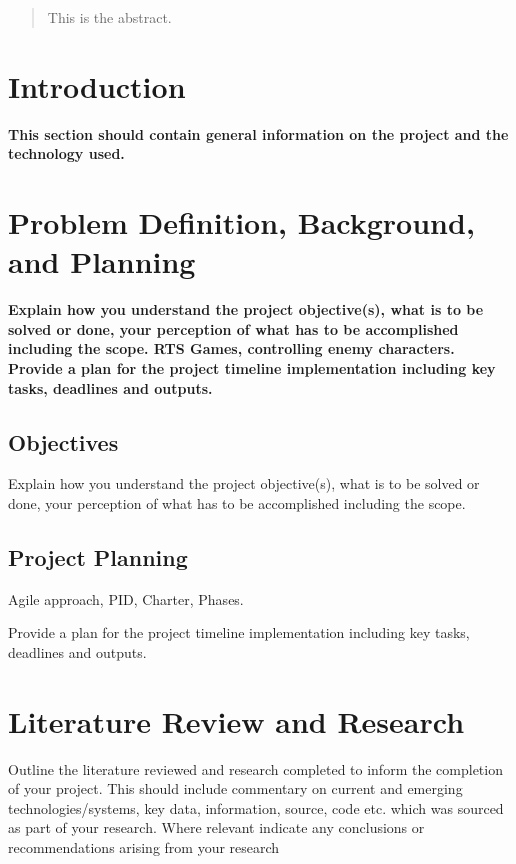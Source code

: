 \documentclass[12pt,a4paper,titlepage]{article}
\begin{document}


\begin{abstract}
This is the abstract.
\end{abstract}

\tableofcontents

\newpage

\listoftables

\newpage

\listoffigures

\newpage

\section{Introduction}
\textbf{This section should contain general information on the project and the technology used.}\\



\section{Problem Definition, Background, and Planning}

\textbf{Explain how you understand the project objective(s), what is to be solved or done, your perception of what has to be accomplished including the scope. RTS Games, controlling enemy characters. Provide a plan for the project timeline implementation including key tasks, deadlines and outputs.}\\

\subsection{Objectives}
Explain how you understand the project objective(s), what is to be solved or done, your perception of what has to be accomplished including the scope. 

\subsection{Project Planning}
Agile approach, PID, Charter, Phases.

Provide a plan for the project timeline implementation including key tasks, deadlines and outputs.

\section{Literature Review and Research}
Outline the literature reviewed and research completed to inform the completion of your project.  This should include commentary on current and emerging technologies/systems, key data, information, source, code etc. which was sourced as part of your research.  Where relevant indicate any conclusions or recommendations arising from your research
\end{document}

